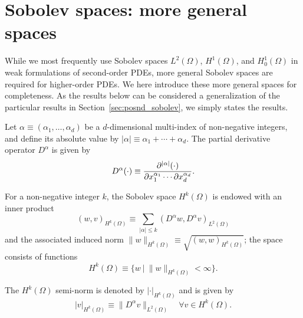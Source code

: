 \section{Sobolev spaces: more general spaces}
While we most frequently use Sobolev spaces $L^2(\Omega)$, $H^1(\Omega)$, and $H^1_0(\Omega)$ in weak formulations of second-order PDEs, more general Sobolev spaces are required for higher-order PDEs.  We here introduce these more general spaces for completeness.  As the results below can be considered a generalization of the particular results in Section~\ref{sec:posnd_sobolev}, we simply states the results.
\begin{definition}
  Let $\alpha \equiv (\alpha_1, \dots, \alpha_d)$ be a $d$-dimensional multi-index of non-negative integers, and define its absolute value by $|\alpha| \equiv \alpha_1 + \cdots + \alpha_d$. The partial derivative operator $D^\alpha$ is given by 
  \begin{equation*}
    D^\alpha (\cdot)  \equiv \frac{\partial ^{|\alpha|} (\cdot)}{\partial x_1^{\alpha_1}  \cdots \partial x_d^{\alpha_d}}.
  \end{equation*}
\end{definition}
\begin{definition}
  For a non-negative integer $k$, the Sobolev space $H^k(\Omega)$ is endowed with an inner product
  \begin{equation*}
    (w,v)_{H^k(\Omega)} \equiv \sum_{|\alpha| \leq k} (D^\alpha w, D^\alpha v)_{L^2(\Omega)}
  \end{equation*}
  and the associated induced norm $\| w \|_{H^k(\Omega)} \equiv \sqrt{(w,w)_{H^k(\Omega)}}$; the space consists of functions
  \begin{equation*}
    H^k(\Omega) \equiv \{ w \ | \ \| w \|_{H^k(\Omega)} < \infty \}.
  \end{equation*}
\end{definition} 
\begin{definition}
  The $H^k(\Omega)$ semi-norm is denoted by $| \cdot |_{H^k(\Omega)}$ and is given by
  \begin{equation*}
    | v |_{H^k(\Omega)} \equiv \| D^\alpha v \|_{L^2(\Omega)} \quad \forall v \in H^k(\Omega).
  \end{equation*}  
\end{definition}
